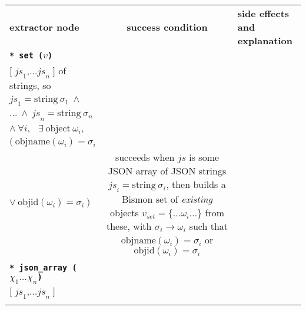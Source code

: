 \begin{table}%
  \begin{relsize}{-1.2}
  \begin{center}
    \begin{tabular}{lcp{5.7cm}}
      \textbf{extractor node} & \hspace*{1cm} \textbf{success condition} \hspace*{1cm}  & \textbf{side effects and explanation} \\

      \texttt{\textbf{* set ($v$)}} &
      \begin{minipage}[t]{4.5cm}
        $\mathit{js} \equiv \mathrm{some ~ JSON ~ array}$ \\
        \hspace*{2em}  $ \mathtt{\textbf{[}} \; \mathit{js}_1  \mathtt{\textbf{,}} \ldots  \mathit{js}_n \; \mathtt{\textbf{]}} $ of strings, so \\
        \hspace*{1em} $\mathit{js}_1 = \mathrm{string} ~ \sigma_1 ~ \wedge$ \\
        \hspace*{2em} $ \ldots ~ \wedge ~ \mathit{js}_n = \mathrm{string} ~ \sigma_n$ \\
        \hspace*{0.5em} $ \wedge ~ \forall i, ~ \; ~ \exists ~ \mathrm{object} ~ \omega_i,$ \\
        \hspace*{1em} $( ~ \mathrm{objname}(\omega_i) = \sigma_i $ \\
        \hspace*{1.8em} $ \vee ~ \mathrm{objid} (\omega_i) = \sigma_i ~ )$ 
      \end{minipage}
      &
      succeeds when $\mathit{js}$ is some JSON array of JSON strings
      $\mathit{js}_i = \mathrm{string} ~ \sigma_i$,
      then builds a Bismon set of \emph{existing} objects $ v_{set} = \{ \ldots \omega_i \ldots \} $ from these, with
      $\sigma_i \rightarrow \omega_i$ such that $\mathrm{objname}(\omega_i) = \sigma_i$ or  $\mathrm{objid}(\omega_i) = \sigma_i$  \\
            \rule{0pt}{1ex} \\
      \texttt{\textbf{* json\_array ($\chi_1 \ldots \chi_n$)}} &
      \begin{minipage}[t]{4.5cm}
        $\mathit{js} \equiv \mathrm{some ~ JSON ~ array}$ \\
        \hspace*{3em}  $ \mathtt{\textbf{[}} \; \mathit{js}_1  \mathtt{\textbf{,}} \ldots  \mathit{js}_n \; \mathtt{\textbf{]}}$ \\

\end{minipage}
\end{tabular}
\end{center}
\end{relsize}
\end{table}
